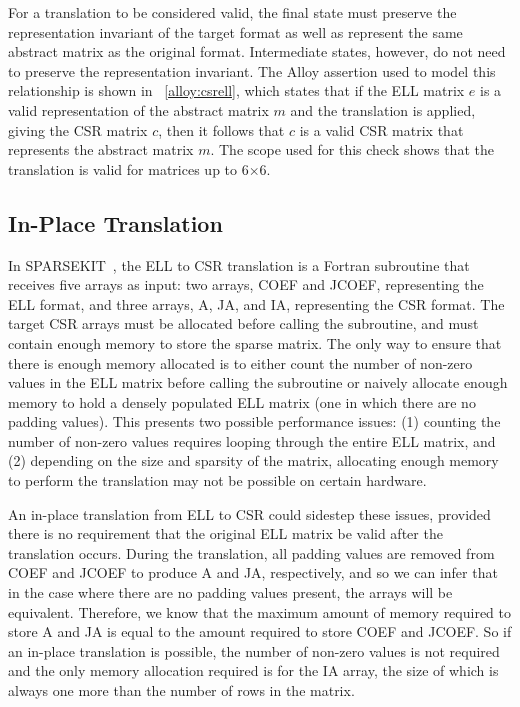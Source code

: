 For a translation to be considered valid, the final state must preserve the representation invariant of the target format as well as represent the same abstract matrix as the original format.  Intermediate states, however, do not need to preserve the representation invariant.  The Alloy assertion used to model this relationship is shown in \figurename~\ref{alloy:csrell}, which states that if the ELL matrix $e$ is a valid representation of the abstract matrix $m$ and the translation is applied, giving the CSR matrix $c$, then it follows that $c$ is a valid CSR matrix that represents the abstract matrix $m$.  The scope used for this check shows that the translation is valid for matrices up to 6$\times$6.

\subsection{In-Place Translation}

In SPARSEKIT~\cite{sparsekit}, the ELL to CSR translation is a Fortran subroutine that receives five arrays as input: two arrays, COEF and JCOEF, representing the ELL format, and three arrays, A, JA, and IA, representing the CSR format.  The target CSR arrays must be allocated before calling the subroutine, and must contain enough memory to store the sparse matrix.  The only way to ensure that there is enough memory allocated is to either count the number of non-zero values in the ELL matrix before calling the subroutine or naively allocate enough memory to hold a densely populated ELL matrix (one in which there are no padding values).  This presents two possible performance issues: (1) counting the number of non-zero values requires looping through the entire ELL matrix, and (2) depending on the size and sparsity of the matrix, allocating enough memory to perform the translation may not be possible on certain hardware.

An in-place translation from ELL to CSR could sidestep these issues, provided there is no requirement that the original ELL matrix be valid after the translation occurs.  
During the translation, all padding values are removed from COEF and JCOEF to produce A and JA, respectively, and so we can infer that in the case where there are no padding values present, the arrays will be equivalent.  Therefore, we know that the maximum amount of memory required to store A and JA is equal to the amount required to store COEF and JCOEF.  So if an in-place translation is possible, the number of non-zero values is not required and the only memory allocation required is for the IA array, the size of which is always one more than the number of rows in the matrix.

